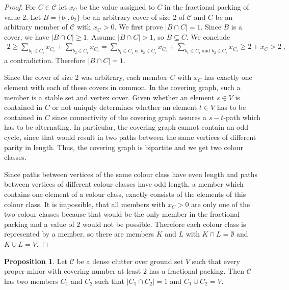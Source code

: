 \documentclass[a4paper, 12pt, twoside=false]{scrbook}
\theoremstyle{definition}
\newtheorem{proposition}{Proposition}
\begin{document}
   \begin{proof}
       For $C \in \mathcal{C}$ let $x_C$ be the value assigned to $C$ in the fractional packing of value 2.
       Let $B=\{b_1,b_2\}$ be an arbitrary cover of size 2 of $\mathcal{C}$ and $C$ be an arbitrary member of $\mathcal{C}$ with $x_{C} > 0$.
       We first prove $|B\cap C| = 1$.
       Since $B$ is a cover, we have $|B\cap C| \geq 1$.
       Assume $|B \cap C| > 1$, so $B \subseteq C$.
       We conclude
       \begin{align*}
           2 \geq \sum_{b_1 \in C_i} x_{C_i} + \sum_{b_2 \in C_i} x_{C_i} = \sum_{b_1 \in C_i \text{ or } b_2 \in C_i} x_{C_i} + \sum_{b_1 \in C_i \text{ and } b_2 \in C_i} x_{C_i} \geq 2 + x_C > 2 \;,
       \end{align*}
       a contradiction. Therefore $|B\cap C| = 1$.

       Since the cover of size 2 was arbitrary, each member $C$ with $x_C$ has exactly one element with each of these covers in common.
       In the covering graph, such a member is a stable set and vertex cover.
       Given whether an element $s \in V$ is contained in $C$ or not uniquly determines whether an element $t \in V$ has to be contained in $C$ since connectivity of the covering graph assures a $s-t$-path which has to be alternating.
       In particular, the covering graph cannot contain an odd cycle, since that would result in two paths between the same vertices of different parity in length. Thus, the covering graph is bipartite and we get two colour classes.

       Since paths between vertices of the same colour class have even length and paths between vertices of different colour classes have odd length, a member which contains one element of a colour class, exactly consists of the elements of this colour class.
       It is impossible, that all members with $x_C > 0$ are only one of the two colour classes because that would be the only member in the fractional packing and a value of 2 would not be possible.
       Therefore each colour class is represented by a member, so there are members $K$ and $L$ with $K \cap L = \emptyset$ and $K \cup L = V$.

   \end{proof}

   \begin{proposition}
       Let $\mathcal{C}$ be a dense clutter over ground set $V$ such that every proper minor with covering number at least 2 has a fractional packing.
       Then $\mathcal{C}$ has two members $C_1$ and $C_2$ such that $|C_1 \cap C_2|=1$ and $C_1 \cup C_2 = V$.
   \end{proposition}
\end{document}
